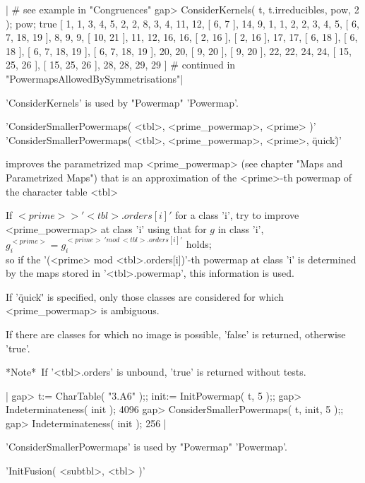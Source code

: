 |    # see example in "Congruences"
    gap> ConsiderKernels( t, t.irreducibles, pow, 2 ); pow;
    true
    [ 1, 1, 3, 4, 5, 2, 2, 8, 3, 4, 11, 12, [ 6, 7 ], 14, 9, 1, 1, 2, 2,
      3, 4, 5, [ 6, 7, 18, 19 ], 8, 9, 9, [ 10, 21 ], 11, 12, 16, 16,
      [ 2, 16 ], [ 2, 16 ], 17, 17, [ 6, 18 ], [ 6, 18 ], 
      [ 6, 7, 18, 19 ], [ 6, 7, 18, 19 ], 20, 20, [ 9, 20 ], [ 9, 20 ], 
      22, 22, 24, 24, [ 15, 25, 26 ], [ 15, 25, 26 ], 28, 28, 29, 29 ]
    # continued in "PowermapsAllowedBySymmetrisations"|

'ConsiderKernels' is used by "Powermap" 'Powermap'.


'ConsiderSmallerPowermaps( <tbl>, <prime\_powermap>, <prime> )'\\
'ConsiderSmallerPowermaps( <tbl>, <prime\_powermap>, <prime>, \"quick\" )'

improves the parametrized map <prime\_powermap> (see chapter "Maps and
Parametrized Maps") that is an approximation of the <prime>-th powermap of
the character table <tbl>\:

If $<prime> > '<tbl>.orders[i]'$ for a class 'i', try to improve
<prime\_powermap> at class 'i' using that for $g$ in class 'i',
$g_i^{<prime>} = g_i^{<prime>\ 'mod\ <tbl>.orders[i]'}$ holds; \\
so if the '(<prime> mod <tbl>.orders[i])'-th powermap at class 'i' is
determined by the maps stored in '<tbl>.powermap', this information is
used.

If '\"quick\"' is specified, only those classes are considered for which
<prime\_powermap> is ambiguous.

If there are classes for which no image is possible, 'false' is returned,
otherwise 'true'.

*Note*\:\ If '<tbl>.orders' is unbound, 'true' is returned without tests.

|    gap> t:= CharTable( "3.A6" );; init:= InitPowermap( t, 5 );;
    gap> Indeterminateness( init );
    4096
    gap> ConsiderSmallerPowermaps( t, init, 5 );;
    gap> Indeterminateness( init );
    256 |

'ConsiderSmallerPowermaps' is used by "Powermap" 'Powermap'.


'InitFusion( <subtbl>, <tbl> )'

